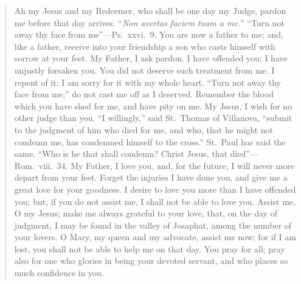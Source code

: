 \begin{quote}
Ah my Jesus and my Redeemer, who shall be one day my Judge, pardon me before that day arrives. ``\textit{Non avertas faciem tuam a me.}'' ``Turn not away thy face from me''---Ps.\ xxvi.\ 9. You are now a father to me; and, like a father, receive into your friendship a son who casts himself with sorrow at your feet. My Father, I ask pardon. I have offended you; I have unjustly forsaken you. You did not deserve such treatment from me. I repent of it; I am sorry for it with my whole heart. ``Turn not away thy face from me;'' do not cast me off as I deserved. Remember the blood which you have shed for me, and have pity on me. My Jesus, I wish for no other judge than you. ``I willingly,'' said St.\ Thomas of Villanova, ``submit to the judgment of him who died for me, and who, that he might not condemn me, has condemned himself to the cross.'' St.\ Paul has said the same. ``Who is he that shall condemn? Christ Jesus, that died''---Rom.\ viii.\ 34. My Father, I love you, and, for the future, I will never more depart from your feet. Forget the injuries I have done you, and give me a great love for your goodness. I desire to love you more than I have offended you; but, if you do not assist me, I shall not be able to love you. Assist me, O my Jesus; make me always grateful to your love, that, on the day of judgment, I may be found in the valley of Josaphat, among the number of your lovers. O Mary, my queen and my advocate, assist me now; for if I am lost, you shall not be able to help me on that day. You pray for all; pray also for one who glories in being your devoted servant, and who places so much confidence in you.
\end{quote}
